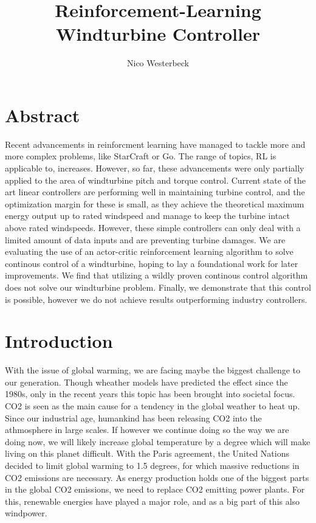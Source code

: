 \documentclass[hyperref,beleg]{cgvpub}
\author{Nico Westerbeck}
\title{Reinforcement-Learning Windturbine Controller}
\begin{document}
\chapter{Abstract}

Recent advancements in reinforcment learning have managed to tackle more and more complex problems, like StarCraft or Go. The range of topics, RL is applicable to, increases. However, so far, these advancements were only partially applied to the area of windturbine pitch and torque control. Current state of the art linear controllers are performing well in maintaining turbine control, and the optimization margin for these is small, as they achieve the theoretical maximum energy output up to rated windspeed and manage to keep the turbine intact above rated windspeeds. However, these simple controllers can only deal with a limited amount of data inputs and are preventing turbine damages. We are evaluating the use of an actor-critic reinforcement learning algorithm to solve continous control of a windturbine, hoping to lay a foundational work for later improvements. We find that utilizing a wildly proven continous control algorithm does not solve our windturbine problem. Finally, we demonstrate that this control is possible, however we do not achieve results outperforming industry controllers.

\chapter{Introduction}

With the issue of global warming, we are facing maybe the biggest challenge to our generation. Though wheather models have predicted the effect since the 1980s, only in the recent years this topic has been brought into societal focus. CO2 is seen as the main cause for a tendency in the global weather to heat up. Since our industrial age, humankind has been releasing CO2 into the athmosphere in large scales. If however we continue doing so the way we are doing now, we will likely increase global temperature by a degree which will make living on this planet difficult. With the Paris agreement, the United Nations decided to limit global warming to 1.5 degrees, for which massive reductions in CO2 emissions are necessary. As energy production holds one of the biggest parts in the global CO2 emissions, we need to replace CO2 emitting power plants. For this, renewable energies have played a major role, and as a big part of this also windpower.
\end{document}
